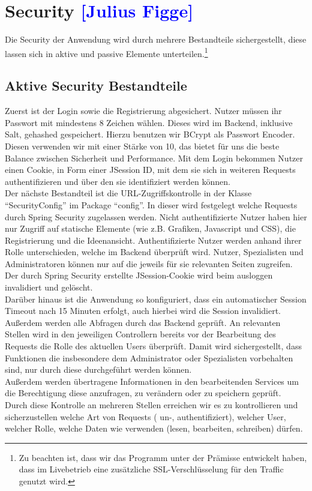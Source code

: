 

\section{Security  \textcolor{blue}{[Julius Figge]}}
\label{Security}

Die Security der Anwendung wird durch mehrere Bestandteile sichergestellt, diese lassen sich in aktive und passive Elemente unterteilen.\footnote{Zu beachten ist, dass wir das Programm unter der Prämisse entwickelt haben, dass im Livebetrieb eine zusätzliche SSL-Verschlüsselung für den Traffic genutzt wird.}

\subsection{Aktive Security Bestandteile}
Zuerst ist der Login sowie die Registrierung abgesichert. Nutzer müssen ihr Passwort mit mindestens 8 Zeichen wählen. Dieses wird im Backend, inklusive Salt, gehashed gespeichert. Hierzu benutzen wir BCrypt als Passwort Encoder. Diesen verwenden wir mit einer Stärke von 10, das bietet für uns die beste Balance zwischen Sicherheit und Performance. Mit dem Login bekommen Nutzer einen Cookie, in Form einer JSession ID, mit dem sie sich in weiteren Requests authentifizieren und über den sie identifiziert werden können.\\
Der nächste Bestandteil ist die URL-Zugriffskontrolle in der Klasse \enquote{SecurityConfig} im Package \enquote{config}. In dieser wird festgelegt welche Requests durch Spring Security zugelassen werden. Nicht authentifizierte Nutzer haben hier nur Zugriff auf statische Elemente (wie z.B. Grafiken, Javascript und CSS), die Registrierung und die Ideenansicht.
Authentifizierte Nutzer werden anhand ihrer Rolle unterschieden, welche im Backend überprüft wird. Nutzer, Spezialisten und Administratoren können nur auf die jeweils für sie relevanten Seiten zugreifen.
Der durch Spring Security erstellte JSession-Cookie wird beim ausloggen invalidiert und gelöscht.\\
Darüber hinaus ist die Anwendung so konfiguriert, dass ein automatischer Session Timeout nach 15 Minuten erfolgt, auch hierbei wird die Session invalidiert.\\
Außerdem werden alle Abfragen durch das Backend geprüft. An relevanten Stellen wird in den jeweiligen Controllern bereits vor der Bearbeitung des Requests die Rolle des aktuellen Users überprüft. Damit wird sichergestellt, dass Funktionen die insbesondere dem Administrator oder Spezialisten vorbehalten sind, nur durch diese durchgeführt werden können. \\
Außerdem werden übertragene Informationen in den bearbeitenden Services um die Berechtigung diese anzufragen, zu verändern oder zu speichern geprüft.\\
Durch diese Kontrolle an mehreren Stellen erreichen wir es zu kontrollieren und sicherzustellen welche Art von Requests ( un-, authentifiziert), welcher User, welcher Rolle, welche Daten wie verwenden (lesen, bearbeiten, schreiben) dürfen.\\

